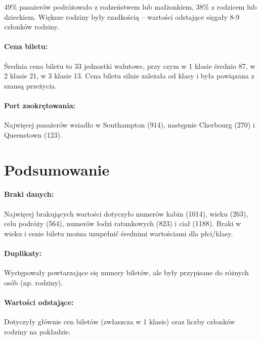 \documentclass[11pt]{article}
\begin{document}
49\% pasażerów podróżowało z rodzeństwem lub małżonkiem, 38\% z rodzicem
lub dzieckiem. Większe rodziny były rzadkością -- wartości odstające
sięgały 8-9 członków rodziny.

\paragraph{Cena biletu:}\label{cena-biletu}

Średnia cena biletu to 33 jednostki walutowe, przy czym w 1 klasie
średnio 87, w 2 klasie 21, w 3 klasie 13. Cena biletu silnie zależała od
klasy i była powiązana z szansą przeżycia.

\paragraph{Port zaokrętowania:}\label{port-zaokrux119towania}

Najwięcej pasażerów wsiadło w Southampton (914), następnie Cherbourg
(270) i Queenstown (123).

    \section{Podsumowanie}\label{podsumowanie}

\paragraph{Braki danych:}\label{braki-danych}

Najwięcej brakujących wartości dotyczyło numerów kabin (1014), wieku
(263), celu podróży (564), numerów łodzi ratunkowych (823) i ciał
(1188). Braki w wieku i cenie biletu można uzupełnić średnimi
wartościami dla płci/klasy.

\paragraph{Duplikaty:}\label{duplikaty}

Występowały powtarzające się numery biletów, ale były przypisane do
różnych osób (np. rodziny).

\paragraph{Wartości odstające:}\label{wartoux15bci-odstajux105ce}

Dotyczyły głównie cen biletów (zwłaszcza w 1 klasie) oraz liczby
członków rodziny na pokładzie.
\end{document}
